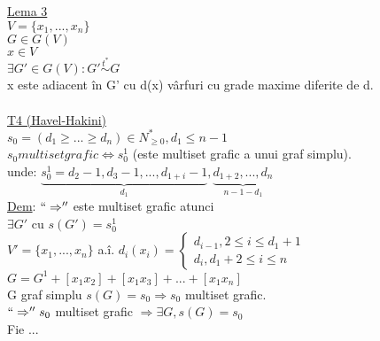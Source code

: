 \documentclass[12pt]{extarticle}
\begin{document}
{		\underline{Lema 3} \\
		$V = \{ x_{1}, ..., x_{n} \}$ \\
		$G \in G(V)$ \\
		$x \in V$ \\
		$\exists G' \in G(V) : G' \overset{t^{*}}{\sim} G$ \\
		x este adiacent în G' cu d(x) vârfuri cu grade maxime diferite de d. \\
		\\
		\underline{T4 (Havel-Hakini)} \\
		$s_{0} = (d_{1} \geq ... \geq d_{n}) \in N^{*}_{\geq 0}, d_{1} \leq n - 1$ \\
		$s_{0} multiset grafic \Leftrightarrow s_{0}^{1}$ (este multiset grafic a unui graf simplu). \\
		unde: $\underset{d_{1}}{\underbrace{s_{0}^{1} = d_{2} - 1, d_{3} - 1, ..., d_{1+i} - 1}}, \underset{n - 1 - d_{1}}{\underbrace{d_{1 + 2}, ..., d_{n}}}$ \\
		\underline{Dem}: $``\Rightarrow''$ este multiset grafic atunci \\
		$\exists G'$ cu $s(G') = s_{0}^{1}$ \\
		$V' = \{ x_{1}, ..., x_{n} \}$ a.î. $d_{i}(x_{i}) = \left\{\begin{matrix}
		d_{i - 1}, 2 \leq i \leq d_{1} + 1 \\ 
		d_{i}, d_{1} + 2 \leq i \leq n
		\end{matrix}\right.$
		$G = G^{1} + [x_{1}x_{2}] + [x_{1}x_{3}] + ... + [x_{1}x_{n}]$ \\
		G graf simplu $s(G) = s_{0} \Rightarrow s_{0}$ multiset grafic. \\
		$``\Rightarrow'' s_{0}$ multiset grafic $\Rightarrow \exists G, s(G) = s_{0}$ \\
		Fie ...
		
	}
\end{document}

